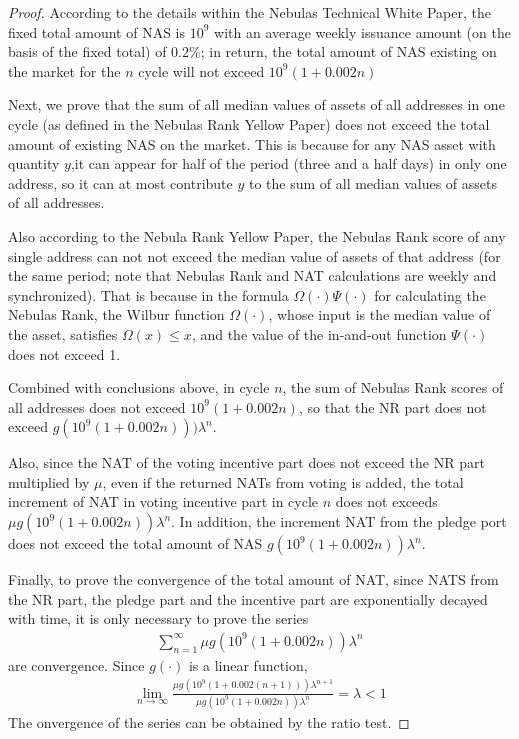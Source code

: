\begin{proof}
	According to the details within the Nebulas Technical White Paper, the fixed total amount of NAS is $10^9$ with an average weekly issuance amount (on the basis of the fixed total) of $0.2\%$; in return, the total amount of NAS existing on the market for the $n$ cycle will not exceed $10^9 (1+0.002n) $

	Next, we prove that the sum of all median values of assets of all addresses in one cycle (as defined in the Nebulas Rank Yellow Paper) does not exceed the total amount of existing NAS on the market. This is because for any NAS asset with quantity $y$,it can appear for half of the period (three and a half days) in only one address, so it can at most contribute $y$ to the sum of all median values of assets of all addresses.

	Also according to the Nebula Rank Yellow Paper, the Nebulas Rank score of any
	single address can not not exceed the median value of assets of that address
	(for the same period; note that Nebulas Rank and NAT calculations are weekly
	and synchronized). That is because in the formula $\Omega(\cdot)\Psi(\cdot)$
	for calculating the Nebulas Rank, the Wilbur function $\Omega(\cdot)$, whose
	input is the median value of the asset, satisfies $\Omega (x) \leq x$, and
	the value of the in-and-out function $\Psi(\cdot)$ does not exceed 1.

	Combined with conclusions above, in cycle $n$, the sum of Nebulas Rank scores of all addresses does not exceed $10^9(1+0.002n)$, so that the NR part does not exceed $g(10^9(1+0.002n)))\lambda^n$.

	Also, since the NAT of the voting incentive part does not exceed the NR part multiplied by $\mu$, even if the returned NATs from voting is added, the total increment of NAT in voting incentive part in cycle $n$ does not exceeds $\mu g(10^9( 1+0.002n))\lambda^n$. In addition, the increment NAT from the pledge port does not exceed the total amount of NAS $g (10^9(1+0.002n))\lambda^n$.

	Finally, to prove the convergence of the total amount of NAT, since NATS  from the NR part, the pledge part and the incentive part are exponentially decayed with time, it is only necessary to prove the series
	\begin{align}
	\sum_{n=1}^{\infty} \mu g(10^9(1+0.002n))\lambda^n
	\end{align}
    are	convergence. Since $g(\cdot)$ is a linear function,
	\begin{align}
	\lim_{n\rightarrow \infty} \frac{\mu g(10^9(1+0.002(n+1)))\lambda^{n+1}}{\mu g(10^9(1+ 0.002n))\lambda^n} = \lambda <1
	\end{align}
	The onvergence of the series can be obtained by the ratio test.
\end{proof}

